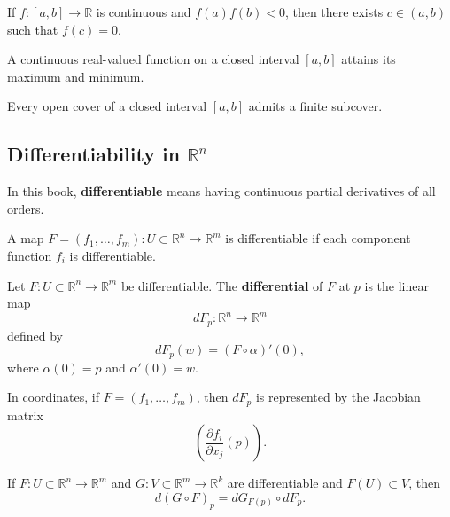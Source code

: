 \documentclass[12pt, oneside]{book}
\begin{document}
\begin{theorem}
    If $f:[a,b]\rightarrow \mathbb{R}$ is continuous and
    $f(a)f(b)<0$, then there exists $c\in(a,b)$ such that $f(c)=0$.
\end{theorem}

\begin{theorem}
    A continuous real-valued function on a closed interval $[a,b]$ attains its
    maximum and minimum.
\end{theorem}

\begin{theorem}
    Every open cover of a closed interval $[a,b]$ admits a finite subcover.
\end{theorem}

\subsection*{Differentiability in \texorpdfstring{$\mathbb{R}^n$}{Rn}}

\begin{definition}
    In this book, \textbf{differentiable} means having continuous partial
    derivatives of all orders.
\end{definition}

\begin{definition}
    A map $F=(f_1,\ldots,f_m):U\subset \mathbb{R}^n\rightarrow
        \mathbb{R}^m$ is differentiable if each component function $f_i$ is
    differentiable.
\end{definition}

\begin{definition}
    Let $F:U\subset \mathbb{R}^n\rightarrow \mathbb{R}^m$ be differentiable.
    The \textbf{differential} of $F$ at $p$ is the linear map
    \[
        dF_p:\mathbb{R}^n\rightarrow \mathbb{R}^m
    \]
    defined by
    \[
        dF_p(w)=(F\circ \alpha)'(0),
    \]
    where $\alpha(0)=p$ and $\alpha'(0)=w$.
\end{definition}

\begin{remark}
    In coordinates, if $F=(f_1,\ldots,f_m)$, then $dF_p$ is represented by the
    Jacobian matrix
    \[
        \left(\frac{\partial f_i}{\partial x_j}(p)\right).
    \]
\end{remark}

\begin{theorem}
    If $F:U\subset \mathbb{R}^n\rightarrow \mathbb{R}^m$ and
    $G:V\subset \mathbb{R}^m\rightarrow \mathbb{R}^k$ are differentiable and
    $F(U)\subset V$, then
    \[
        d(G\circ F)_p=dG_{F(p)}\circ dF_p .
    \]
\end{theorem}
\end{document}
